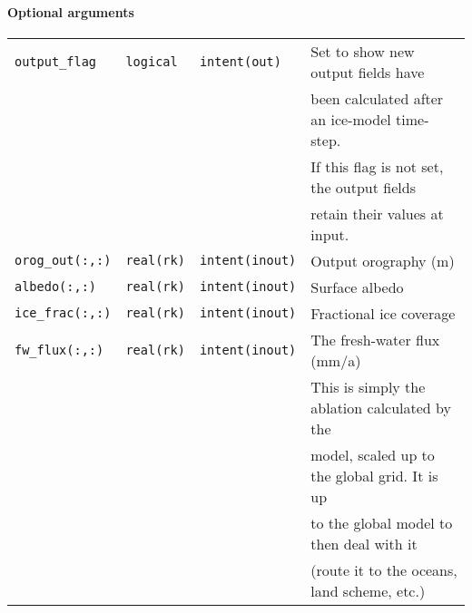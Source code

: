 \paragraph{Optional arguments}
%
\begin{center}
\begin{tabular}{llll}
\texttt{output\_flag} & \texttt{logical} & \texttt{intent(out)} & Set to show
new output fields have \\
 & & & been calculated after an ice-model time-step. \\
 & & & If this flag is not set, the output fields \\
 & & & retain their values at input. \\
\texttt{orog\_out(:,:)} & \texttt{real(rk)} & \texttt{intent(inout)} & Output
orography (m)\\ 
\texttt{albedo(:,:)} & \texttt{real(rk)} & \texttt{intent(inout)} & Surface
albedo \\
\texttt{ice\_frac(:,:)} & \texttt{real(rk)} & \texttt{intent(inout)} &
Fractional ice coverage \\
\texttt{fw\_flux(:,:)} & \texttt{real(rk)} & \texttt{intent(inout)} & The
fresh-water flux (mm/a) \\
 & & & This is simply the ablation calculated by the \\
 & & & model, scaled up to the global grid. It is up \\
 & & & to the global model to then  deal with it \\
 & & & (route it to the oceans, land scheme, etc.) \\
\end{tabular}
\end{center}
